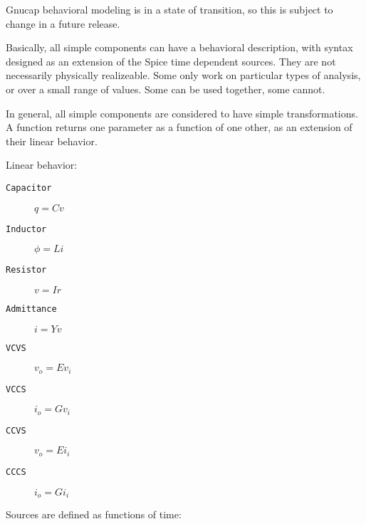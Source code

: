 %
%
%
%
Gnucap behavioral modeling is in a state of transition, so this is
subject to change in a future release.

Basically, all simple components can have a behavioral description,
with syntax designed as an extension of the Spice time dependent
sources.  They are not necessarily physically realizeable.  Some only
work on particular types of analysis, or over a small range of
values.  Some can be used together, some cannot.

In general, all simple components are considered to have simple
transformations.  A function returns one parameter as a function of
one other, as an extension of their linear behavior.

Linear behavior:

\begin{description}
\item[{\tt Capacitor}] $q = C v$
\item[{\tt Inductor}] $\phi = L i$
\item[{\tt Resistor}] $v = I r$
\item[{\tt Admittance}] $i = Y v$
\item[{\tt VCVS}] $v_o = E v_i$
\item[{\tt VCCS}] $i_o = G v_i$
\item[{\tt CCVS}] $v_o = E i_i$
\item[{\tt CCCS}] $i_o = G i_i$
\end{description}

Sources are defined as functions of time:

